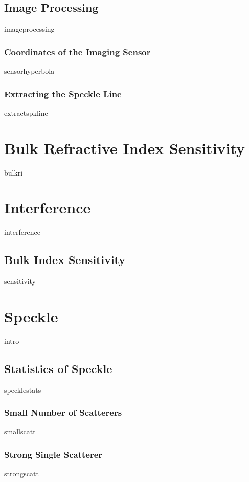 \documentclass[a4paper,titlepage,onecolumn]{report}
\begin{document}
 \section{Image Processing}
 {imageprocessing}
  \subsection{Coordinates of the Imaging Sensor}
  {sensorhyperbola}
  \subsection{Extracting the Speckle Line}
  {extractspkline}

\chapter{Bulk Refractive Index Sensitivity} \label{ch:bulkri}
{bulkri}

\chapter{Interference} \label{ch:interference}
{interference}
	\section{Bulk Index Sensitivity}
	{sensitivity}

\chapter{Speckle} \label{ch:speckle}
{intro}
 \section{Statistics of Speckle}
	{specklestats}
		\subsection{Small Number of Scatterers}
		{smallscatt}
		\subsection{Strong Single Scatterer}
		{strongscatt}
\end{document}
